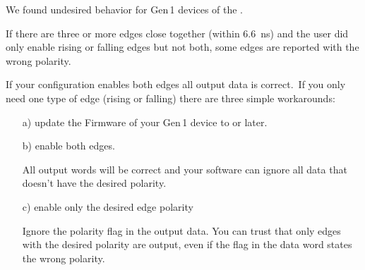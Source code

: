 We found undesired behavior for Gen\,1 devices of the \deviceName.\par
If there are three or more edges close together (within \SI{6.6}{\nano\second}) 
and the user did only enable rising or falling edges but not both, some edges 
are reported with the wrong polarity. \

If your configuration enables both edges all output data is correct.\
If you only need one type of edge (rising or falling) there are three simple 
workarounds:\ 

\begin{itemize}
    \item[a)] update the Firmware of your Gen\,1 device to  or later.
    \item[b)] enable both edges.\par
    All output words will be correct and your software can ignore all data that doesn't have the desired polarity.
    \item[c)] enable only the desired edge polarity\par 
    Ignore the polarity flag in the output data. You can trust that only edges with the desired polarity are output, even if the flag in the data word states the wrong polarity.
\end{itemize}